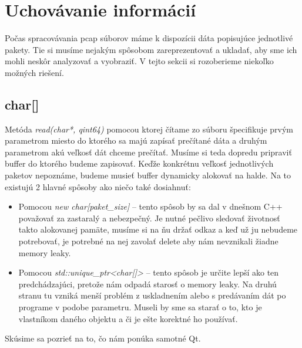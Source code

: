 \section{Uchovávanie informácií}
Počas spracovávania pcap súborov máme k dispozícii dáta popisujúce jednotlivé pakety. Tie si musíme nejakým spôsobom zareprezentovať a ukladať, aby sme ich mohli neskôr analyzovať a vyobraziť. V tejto sekcii si rozoberieme niekoľko možných riešení.

\subsection*{char[]}
Metóda \textit{read(char*, qint64)} pomocou ktorej čítame zo súboru špecifikuje prvým parametrom miesto do ktorého sa majú zapísať prečítané dáta a druhým parametrom akú veľkosť dát chceme prečítať. Musíme si teda dopredu pripraviť buffer do ktorého budeme zapisovať. Keďže konkrétnu veľkosť jednotlivých paketov nepoznáme, budeme musieť buffer dynamicky alokovať na halde. Na to existujú 2 hlavné spôsoby ako niečo také dosiahnuť:
\begin{itemize}
\item Pomocou \textit{new char[paket\_size]} -- tento spôsob by sa dal v dnešnom C++ považovať za zastaralý a nebezpečný. Je nutné pečlivo sledovať životnosť takto alokovanej pamäte, musíme si na ňu držať odkaz a keď už ju nebudeme potrebovať, je potrebné na nej zavolať delete aby nám nevznikali žiadne memory leaky.
\item Pomocou \textit{std::unique\_ptr\textless char[]\textgreater} -- tento spôsob je určite lepší ako ten predchádzajúci, pretože nám odpadá starosť o memory leaky. Na druhú stranu tu vzniká menší problém z uskladnením alebo s predávaním dát po programe v podobe parametru. Museli by sme sa starať o to, kto je vlastníkom daného objektu a či je ešte korektné ho používať.
\end{itemize}

Skúsime sa pozrieť na to, čo nám ponúka samotné Qt.

